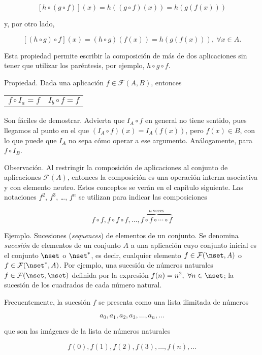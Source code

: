 $$ [h \circ (g \circ f)](x) = h((g \circ f)(x)) = h(g(f(x))) $$

\noindent y, por otro lado,

$$ [(h \circ g) \circ f](x) = (h \circ g)(f(x)) = h(g(f(x))), \ \forall x
\in A. $$

\noindent Esta propiedad permite escribir la composición de más de dos
aplicaciones sin tener que utilizar los paréntesis, por ejemplo, $h \circ g
\circ f$.

Propiedad. Dada una aplicación $f \in \mathcal{F}(A, B)$, entonces

\begin{center}
\begin{tabular}{lr}
  $f \circ I_a = f$
    & $I_b \circ f = f$
\end{tabular}
\end{center}

Son fáciles de demostrar. Advierta que $I_A \circ f$ en general no tiene
sentido, pues llegamos al punto en el que $(I_A \circ f)(x) = I_A(f(x))$,
pero $f(x) \in B$, con lo que puede que $I_A$ no sepa cómo operar a ese
argumento. Análogamente, para $f \circ I_B$.

Observación. Al restringir la composición de aplicaciones al conjunto de
aplicaciones $\mathcal{F}(A)$, entonces la composición es una operación
interna asociativa y con elemento neutro. Estos conceptos se verán en el
capítulo siguiente. Las notaciones $f^2$, $f^3$, \ldots, $f^n$ se utilizan
para indicar las composiciones

$$ f \circ f, f \circ f \circ f, \ldots, \overbrace{f \circ f \circ \cdots
\circ f}^{n\ \text{veces}} $$

Ejemplo. Sucesiones (\emph{sequences}) de elementos de un conjunto. Se
denomina \emph{sucesión} de elementos de un conjunto $A$ a una aplicación
cuyo conjunto inicial es el conjunto $\nset$ o $\nset^*$, es decir,
cualquier elemento $f \in \mathcal{F}(\nset, A)$ o $f \in
\mathcal{F}(\nset^*, A)$. Por ejemplo, una sucesión de números naturales $f
\in \mathcal{F}(\nset, \nset)$ definida por la expresión $f(n) = n^2, \
\forall n \in \nset$; la sucesión de los cuadrados de cada número natural.

Frecuentemente, la sucesión $f$ se presenta como una lista ilimitada de
números

$$ a_0, a_1, a_2, a_3, \ldots, a_n, \ldots $$

\noindent que son las imágenes de la lista de números naturales

$$ f(0), f(1), f(2), f(3), \ldots, f(n), \ldots $$

